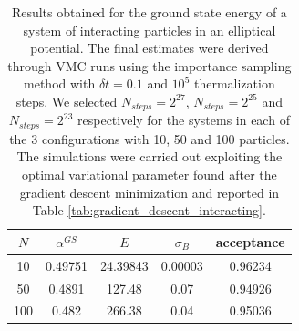 {\begin{table}[h!]
    \centering
    \begin{tabular}{ccccc}
    \toprule
            $N$ & $\alpha^{GS}$ & $E$ & $\sigma_B$ & acceptance \\
            \midrule
            10 & 0.49751 & 24.39843 & 0.00003 & 0.96234 \\
            50 & 0.4891 & 127.48 & 0.07 & 0.94926 \\
            100 & 0.482 & 266.38 & 0.04 & 0.95036 \\
            \midrule
        \end{tabular}
    \caption{Results obtained for the ground state energy of a system of interacting particles in an elliptical potential. The final estimates were derived through VMC runs using the importance sampling method with $\delta t = 0.1$ and $10^{5}$ thermalization steps. We selected $N_{steps}=2^{27}$, $N_{steps}=2^{25}$ and $N_{steps}=2^{23}$ respectively for the systems in each of the 3 configurations with 10, 50 and 100 particles. The simulations were carried out exploiting the optimal variational parameter found after the gradient descent minimization and reported in Table \ref{tab:gradient_descent_interacting}. }
    \label{tab:final_GS_energy}
\end{table}}


